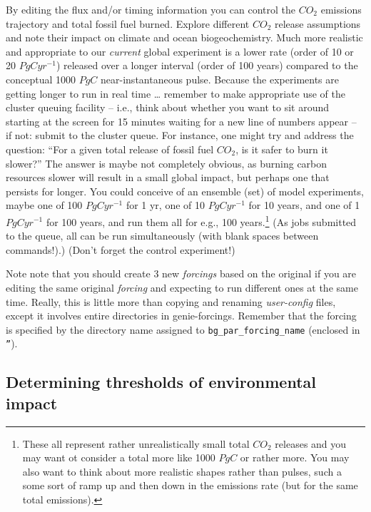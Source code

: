 \documentclass[11pt,fleqn]{book} %
\begin{document}
By editing the flux and/or timing information you can control the \(CO_{2}\) emissions trajectory and total fossil fuel burned. Explore different \(CO_{2}\) release assumptions and note their impact on climate and ocean biogeochemistry. Much more realistic and appropriate to our \textit{current} global experiment is a lower rate (order of 10 or 20 \(PgCyr^{-1}\)) released over a longer interval (order of 100 years) compared to the conceptual 1000 \(PgC\) near-instantaneous pulse. Because the experiments are getting longer to run in real time … remember to make appropriate use of the cluster queuing facility – i.e., think about whether you want to sit around starting at the screen for 15 minutes waiting for a new line of numbers appear – if not: submit to the cluster queue. For instance, one might try and address the question: “For a given total release of  fossil fuel \(CO_{2}\), is it safer to burn it slower?” The answer is maybe not completely obvious, as burning carbon resources slower will result in a small global impact, but perhaps one that persists for longer. You could conceive of an ensemble (set) of model experiments, maybe one of 100 \(PgCyr^{-1}\) for 1 yr, one of 10 \(PgCyr^{-1}\) for 10 years, and one of 1 \(PgCyr^{-1}\) for 100 years, and run them all for e.g., 100 years.\footnote{These all represent rather unrealistically small total \(CO_{2}\) releases and you may want ot consider a total more like 1000 \(PgC\) or rather more. You may also want to think about more realistic shapes rather than pulses, such a some sort of ramp up and then down in the emissions rate (but for the same total emissions).} (As jobs submitted to the queue, all can be run simultaneously (with blank spaces between commands!).) (Don’t forget the control experiment!)

Note note that you should create 3 new \textit{forcings} based on the original if you are editing the same original  \textit{forcing} and expecting to run different ones at the same time. Really, this is little more than copying and renaming \textit{user-config} files, except it involves entire directories in genie-forcings. Remember that the forcing is specified by the directory name assigned to \texttt{bg\_par\_forcing\_name} (enclosed in \texttt{''}).


\subsection{Determining thresholds of environmental impact}
\end{document}
